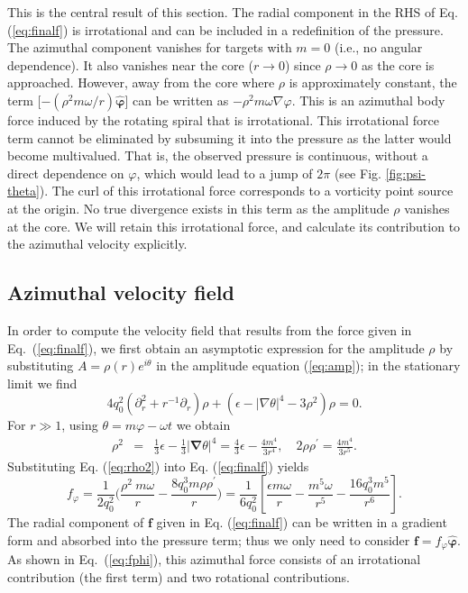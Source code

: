 \documentclass[preprint,prx,floatfix]{revtex4-1}
\begin{document}
This is the central result of this section. The radial component in the RHS of Eq. (\ref{eq:finalf}) is irrotational and can be included in a redefinition of the pressure. The azimuthal component vanishes for targets with $m = 0$ (i.e., no angular dependence). It also vanishes near the core ($r \rightarrow 0$) since $\rho \rightarrow 0$ as the core is approached. However, away from the core where $\rho$ is approximately constant, the term [$-(\rho^2 m \omega/r) \hat{\bm \varphi}$] can be written as $-\rho^{2} m \omega \nabla \varphi$. This is an azimuthal body force induced by the rotating spiral that is irrotational. This irrotational force term cannot be eliminated by subsuming it into the pressure as the latter would become multivalued. That is, the observed pressure is continuous, without a direct dependence on $\varphi$, which would lead to a jump of $2\pi$ (see Fig. \ref{fig:psi-theta}). The curl of this irrotational force corresponds to a vorticity point source at the origin. No true divergence exists in this term as the amplitude $\rho$ vanishes at the core. We will retain this irrotational force, and calculate its contribution to the azimuthal velocity explicitly.

\subsection{Azimuthal velocity field}
\label{sec:vel}

In order to compute the velocity field that results from the force given in Eq.~(\ref{eq:finalf}), we first obtain an asymptotic expression for the amplitude $\rho$ by substituting $A = \rho(r)e^{i\theta}$ in the amplitude equation (\ref{eq:amp}); in the stationary limit we find
\begin{equation}
 4 q_0^2(\partial_r^2+r^{-1}\partial_r)\rho+(\epsilon-|\nabla\theta|^4-3\rho^2)\rho  =  0.
\end{equation}
For $r \gg 1$, using $\theta = m \varphi - \omega t$ we obtain
\begin{eqnarray}
\rho^2 &=& \frac{1}{3}\epsilon - \frac{1}{3}|\bm{\nabla}\theta|^4 = \frac{4}{3}\epsilon - \frac{4 m^4}{3 r^4}, \quad 2\rho\rho^\prime =\frac{4 m^4}{3 r^5}.
\label{eq:rho2}    
\end{eqnarray}
Substituting Eq. (\ref{eq:rho2}) into Eq. (\ref{eq:finalf}) yields 
\begin{equation}
f_\varphi  = \frac{1}{2 q_0^2}\bigg(\frac{\rho^2\ m\omega}{r}-\frac{8q_0^3m\rho\rho^\prime}{r}\bigg) = \frac{1}{6 q_0^2}\left[\frac{\epsilon m\omega}{r}-\frac{ m^5\omega}{r^5} - \frac{16 q_0^3 m^5}{r^6}\right].
\label{eq:fphi}
\end{equation}
The radial component of $\mathbf{f}$ given in Eq. (\ref{eq:finalf}) can be written in a gradient form and absorbed into the pressure term; thus we only need to consider $\mathbf{f} = f_\varphi\hat{{\bm{\varphi}}}$. As shown in Eq.~(\ref{eq:fphi}), this azimuthal force consists of an irrotational contribution (the first term) and two rotational contributions.
\end{document}
